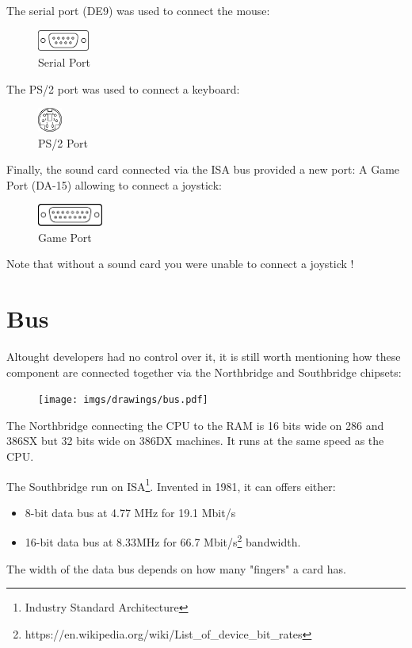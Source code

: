\documentclass[book.tex]{subfiles}
\begin{document}
The serial port (DE9) was used to connect the mouse:
 \begin{figure}[H]
\centering
\includegraphics[width=0.15\textwidth]{imgs/drawings/ports/DE9_serial_port.eps}
\caption{Serial Port}
\label{fig:serialPort}
\end{figure}

The PS/2 port was used to connect a keyboard:
 \begin{figure}[H]
\centering
\includegraphics[width=0.07\textwidth]{imgs/drawings/ports/MiniDIN-6_PS2.eps}
\caption{PS/2 Port}
\label{fig:ps2Port}
\end{figure}


Finally, the sound card connected via the ISA bus provided a new port: A Game Port (DA-15) allowing to connect a joystick:
 \begin{figure}[H]
\centering
\includegraphics[width=0.19\textwidth]{imgs/drawings/ports/DA-15_GamePort.eps}
\caption{Game Port}
\label{fig:gamePort}
\end{figure}

Note that without a sound card you were unable to connect a joystick !


\section{Bus}
Altought developers had no control over it, it is still worth mentioning how these component are connected together via the Northbridge and Southbridge chipsets:\\ 
\par
\begin{figure}[H]
\centering
      \texttt{[image: imgs/drawings/bus.pdf]}
\end{figure}
\par
The Northbridge connecting the CPU to the RAM is 16 bits wide on 286 and 386SX but 32 bits wide on 386DX machines. It runs at the same speed as the CPU.\\
\par
The Southbridge run on ISA\footnote{Industry Standard Architecture}. Invented in 1981, it can offers either:
\begin{itemize}
\item 8-bit data bus at 4.77 MHz  for 19.1 Mbit/s
\item 16-bit data bus at 8.33MHz for 66.7 Mbit/s\footnote{https://en.wikipedia.org/wiki/List\_of\_device\_bit\_rates} bandwidth.
\end{itemize}
The width of the data bus depends on how many "fingers" a card has.\\
\par
\end{document}
